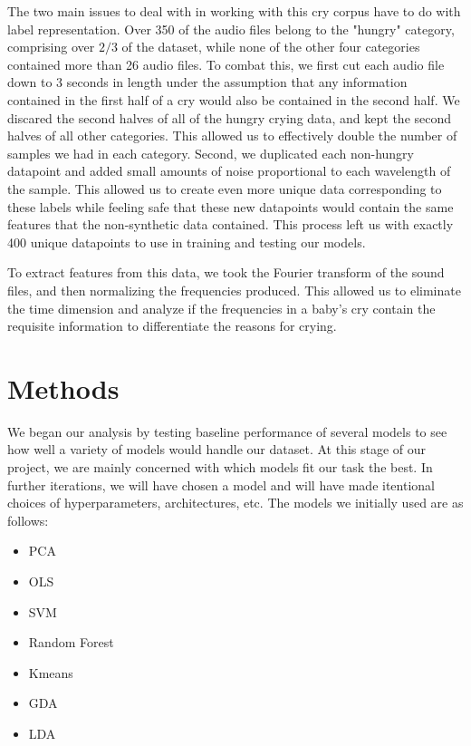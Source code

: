 \documentclass[10pt,letterpaper]{article}
\begin{document}
The two main issues to deal with in working with this cry corpus have to do with label representation.
Over 350 of the audio files belong to the "hungry" category, comprising over $2/3$ of the dataset, while none of the other four categories contained more than 26 audio files.
To combat this, we first cut each audio file down to 3 seconds in length under the assumption that any information contained in the first half of a cry would also be contained in the second half.
We discared the second halves of all of the hungry crying data, and kept the second halves of all other categories.
This allowed us to effectively double the number of samples we had in each category.
Second, we duplicated each non-hungry datapoint and added small amounts of noise proportional to each wavelength of the sample.
This allowed us to create even more unique data corresponding to these labels while feeling safe that these new datapoints would contain the same features that the non-synthetic data contained.
This process left us with exactly 400 unique datapoints to use in training and testing our models.

To extract features from this data, we took the Fourier transform of the sound files, and then normalizing the frequencies produced.
This allowed us to eliminate the time dimension and analyze if the frequencies in a baby's cry contain the requisite information to differentiate the reasons for crying.


\section{Methods}
We began our analysis by testing baseline performance of several models to see how well a variety of models would handle our dataset. At this stage of our project, we are mainly concerned with which models fit our task the best. In further iterations, we will have chosen a model and will have made itentional choices of hyperparameters, architectures, etc. The models we initially used are as follows:
\begin{itemize}
   \item{PCA}
   \item{OLS}
   \item{SVM}
   \item{Random Forest}
   \item{Kmeans}
   \item{GDA}
   \item{LDA}
\end{itemize}
\end{document}
